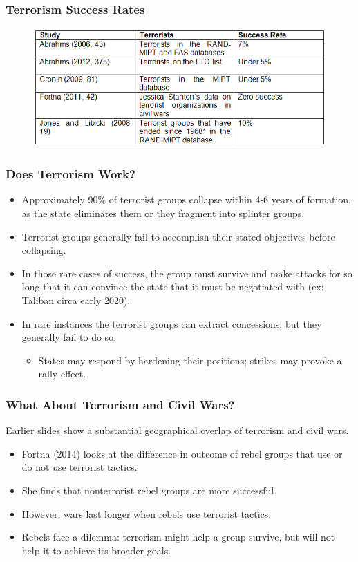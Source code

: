 \documentclass[handout]{beamer}
\begin{document}
\begin{frame} 
	\frametitle{\LARGE{Terrorism Success Rates}}
	\begin{figure}[ht!]
		\centering
		\includegraphics[width=\textwidth,height=0.9\textheight,keepaspectratio]{terrorsuccess.png}
	\end{figure}
\end{frame}

\begin{frame} 
	\frametitle{\LARGE{Does Terrorism Work?}}
	\begin{itemize}
		\item Approximately 90\% of terrorist groups collapse within 4-6 years of formation, as the state eliminates them or they fragment into splinter groups. \pause
		\item Terrorist groups generally fail to accomplish their stated objectives before collapsing. \pause
		\item In those rare cases of success, the group must survive and make attacks for so long that it can convince the state that it must be negotiated with (ex: Taliban circa early 2020). \pause
		\item In rare instances the terrorist groups can extract concessions, but they generally fail to do so. \pause
		\begin{itemize}
			\item States may respond by hardening their positions; strikes may provoke a rally effect.
		\end{itemize}
	\end{itemize}
\end{frame}

\begin{frame} 
\frametitle{\LARGE{What About Terrorism and Civil Wars?}}
Earlier slides show a substantial geographical overlap of terrorism and civil wars.
\begin{itemize}
		\item Fortna (2014) looks at the difference in outcome of rebel groups that use or do not use terrorist tactics. \pause 
		\item She finds that nonterrorist rebel groups are more successful. \pause 
		\item However, wars last longer when rebels use terrorist tactics. \pause 
		\item Rebels face a dilemma: terrorism might help a group survive, but will not help it to achieve its broader goals. 
\end{itemize}
\end{frame}
\end{document}
